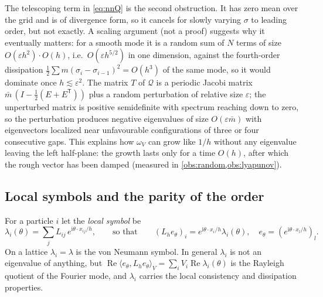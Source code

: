 \documentclass[11pt,a4paper]{article}
\theoremstyle{plain}
\theoremstyle{definition}
\theoremstyle{remark}
\numberwithin{equation}{section}
\renewcommand{\Re}{\operatorname{Re}}
\newcommand{\ii}{\mathrm{i}}
\begin{document}
The telescoping term in \eqref{eq:nnQ} is the second obstruction. It has zero mean over the grid and is of divergence form, so it cancels for slowly varying $\sigma$ to leading order, but not exactly. A scaling argument (not a proof) suggests why it eventually matters: for a smooth mode it is a random sum of $N$ terms of size $O(\varepsilon h^2)\cdot O(h)$, i.e.\ $O(\varepsilon h^{5/2})$ in one dimension, against the fourth-order dissipation $\tfrac12\sum m(\sigma_i-\sigma_{i-1})^2=O(h^3)$ of the same mode, so it would dominate once $h\lesssim\varepsilon^2$. The matrix $T$ of $\mathcal Q$ is a periodic Jacobi matrix $\bar m\,(I-\tfrac12(E+E^{\mathsf T}))$ plus a random perturbation of relative size $\varepsilon$; the unperturbed matrix is positive semidefinite with spectrum reaching down to zero, so the perturbation produces negative eigenvalues of size $O(\varepsilon\bar m)$ with eigenvectors localized near unfavourable configurations of three or four consecutive gaps. This explains how $\omega_V$ can grow like $1/h$ without any eigenvalue leaving the left half-plane: the growth lasts only for a time $O(h)$, after which the rough vector has been damped (measured in \cref{obs:random,obs:lyapunov}).

\subsection{Local symbols and the parity of the order}

For a particle $i$ let the \emph{local symbol} be
\begin{equation}\label{eq:localsymbol}
\lambda_i(\theta)=\sum_jL_{ij}\,e^{\ii\theta\cdot x_{ij}/h},\qquad\text{so that}\qquad (L_he_\theta)_i=e^{\ii\theta\cdot x_i/h}\lambda_i(\theta),\quad e_\theta=(e^{\ii\theta\cdot x_l/h})_l .
\end{equation}
On a lattice $\lambda_i=\lambda$ is the von Neumann symbol. In general $\lambda_i$ is not an eigenvalue of anything, but $\Re\langle e_\theta,L_he_\theta\rangle_V=\sum_iV_i\Re\lambda_i(\theta)$ is the Rayleigh quotient of the Fourier mode, and $\lambda_i$ carries the local consistency and dissipation properties.
\end{document}
